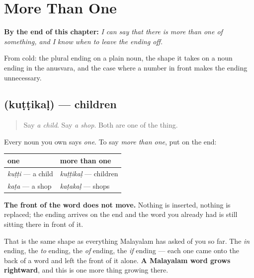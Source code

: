 
\chapter{More Than One}
\label{ch:ml-plural}

\begin{chapteropening}
\textbf{By the end of this chapter:} \emph{I can say that there is more than one of something, and I know when to leave the ending off.}

From cold: the plural ending on a plain noun, the shape it takes on a noun ending in the anusvara, and the case where a number in front makes the ending unnecessary.
\end{chapteropening}

\section[\texorpdfstring{\ml{കുട്ടികൾ} (kuṭṭikaḷ)}{കുട്ടികൾ (kuṭṭikaḷ)}]{ (kuṭṭikaḷ) — children}

\label{lesson:ML-C93-kal}



\begin{quote}
Say \emph{a child}. Say \emph{a shop}. Both are one of the thing.
\end{quote}

\begin{grammarlens}[title={Grammar Lens: the ending goes on the end}]
Every noun you own says \emph{one}. To say \emph{more than one}, put \textbf{} on the end:

\noindent
\begin{tabularx}{\linewidth}{@{}>{\raggedright\arraybackslash}X>{\raggedright\arraybackslash}X@{}}
\toprule
\textbf{one} & \textbf{more than one} \\
\midrule
\textbf{\ml{കുട്ടി}} \emph{kuṭṭi} — a child & \textbf{\ml{കുട്ടികൾ}} \emph{kuṭṭikaḷ} — children \\
\textbf{\ml{കട}} \emph{kaṭa} — a shop & \textbf{\ml{കടകൾ}} \emph{kaṭakaḷ} — shops \\
\bottomrule
\end{tabularx}

\textbf{The front of the word does not move.} Nothing is inserted, nothing is replaced; the ending arrives on the end and the word you already had is still sitting there in front of it.

That is the same shape as everything Malayalam has asked of you so far. The \emph{in} ending, the \emph{to} ending, the \emph{of} ending, the \emph{if} ending — each one came onto the back of a word and left the front of it alone. \textbf{A Malayalam word grows rightward}, and this is one more thing growing there.
\end{grammarlens}

